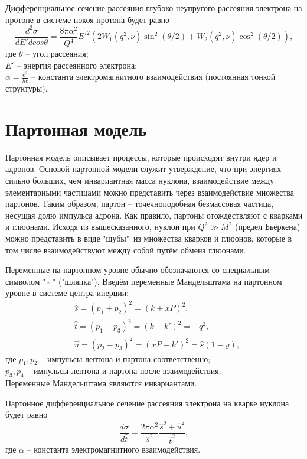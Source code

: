 \documentclass{extarticle}
\begin{document}
Дифференциальное сечение рассеяния глубоко неупругого рассеяния электрона на протоне в системе покоя протона будет равно
\begin{equation}
	\frac{d^2\sigma}{dE' d cos\theta} = \frac{8\pi \alpha^2}{Q^4} E'^2 (2W_1(q^2, \nu) \sin^2 (\theta /2) + W_2 (q^2, \nu) \cos^2 (\theta/2)),
\end{equation}
где $\theta$ -- угол рассеяния; \\ $E'$ -- энергия рассеянного электрона; \\ $\alpha = \frac{e^2}{hc}$ -- константа электромагнитного взаимодействия (постоянная тонкой структуры).
\newpage
\section{Партонная модель}
Партонная модель описывает процессы, которые происходят внутри ядер и адронов. Основой партонной модели служит утверждение, что при энергиях сильно больших, чем инвариантная масса нуклона, взаимодействие между элементарными частицами можно представить через взаимодействие множества партонов. Таким образом, партон -- точечноподобная безмассовая частица, несущая долю импульса адрона. Как правило, партоны отождествляют с кварками и глюонами. 
Исходя из вышесказанного, нуклон при $Q^2 \gg M^2$ (предел Бьёркена) можно представить в виде "шубы"\ из множества кварков и глюонов, которые в том числе взаимодействуют между собой путём обмена глюонами.


Переменные на партонном уровне обычно обозначаются со специальным символом "\ $\hat{}$ " ("шляпка"). Введём переменные Мандельштама на партонном уровне в системе центра инерции:
\begin{equation}
\begin{split}
	& \hat{s} = (p_1+p_2)^2 = (k + xP)^2, \\
	& \hat{t} = (p_1-p_3)^2 = (k-k')^2 = -q^2, \\
	& \hat{u} = (p_2-p_3)^2 =(xP-k')^2= \hat{s} (1-y),
\end{split}
\end{equation}
где $p_1, p_2$ -- импульсы лептона и партона соответственно; \\ $p_3, p_4$ -- импульсы лептона и партона после взаимодействия. \\
Переменные Мандельштама являются инвариантами. 

Партонное дифференциальное сечение рассеяния электрона на кварке нуклона будет равно
\begin{equation}
	\frac{d\sigma}{d\hat{t}} = \frac{2\pi \alpha^2}{\hat{s}^2} \frac{\hat{s}^2 + \hat{u}^2}{\hat{t}^2},
\end{equation}
где $\alpha$ -- константа электромагнитного взаимодействия. 
\end{document}
